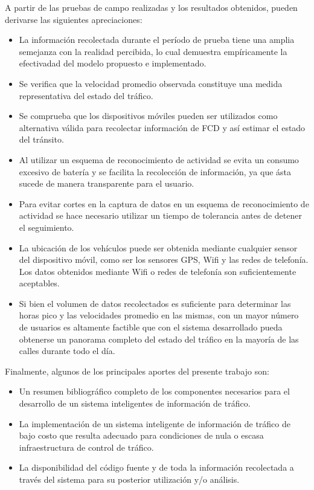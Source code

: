 A partir de las pruebas de campo realizadas y los resultados obtenidos, pueden derivarse las siguientes apreciaciones:
\begin{itemize}
\item La información recolectada durante el período de prueba tiene una amplia semejanza con la realidad percibida, lo cual demuestra empíricamente la efectivadad del modelo propuesto e implementado.
\item Se verifica que la velocidad promedio observada constituye una medida representativa del estado del tráfico.

\item Se comprueba que los dispositivos móviles pueden ser utilizados como alternativa válida para recolectar información de FCD y así estimar el estado del tránsito.

\item Al utilizar un esquema de reconocimiento de actividad se evita un consumo excesivo de batería y se facilita la recolección de información, ya que ásta sucede de manera transparente para el usuario.

\item Para evitar cortes en la captura de datos en un esquema de reconocimiento de actividad se hace necesario utilizar un tiempo de tolerancia antes de detener el seguimiento.

\item La ubicación de los vehículos puede ser obtenida mediante cualquier sensor del dispositivo móvil, como ser los sensores GPS, Wifi y las redes de telefonía. Los datos obtenidos mediante Wifi o redes de telefonía son suficientemente aceptables.

\item Si bien el volumen de datos recolectados es suficiente para determinar las horas pico y las velocidades promedio en las mismas, con un mayor número de usuarios es altamente factible que con el sistema desarrollado pueda obtenerse un panorama completo del estado del tráfico en la mayoría de las calles durante todo el día.
\end{itemize}

Finalmente, algunos de los principales aportes del presente trabajo son:

\begin{itemize}
\item Un resumen bibliográfico completo de los componentes necesarios para el desarrollo de un sistema inteligentes de información de tráfico.

\item La implementación de un sistema inteligente de información de tráfico de bajo costo que resulta adecuado para condiciones de nula o escasa infraestructura de control de tráfico.

\item La disponibilidad del código fuente y de toda la información recolectada a través del sistema para su posterior utilización y/o análisis.
\end{itemize}

